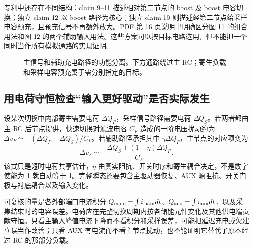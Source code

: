 专利中还存在不同结构：claim 9--11 描述相对第二节点的 boost 及 boost 电容切换；独立 claim 12 以 boost 路径为核心；独立 claim 19 则描述经第二节点给采样电容预充，且预充信号不再额外放大。PDF 第 16 页说明书明确区分图 11 的组合用法和图 12 的两个辅助输入用法。这些方案可以按目标电路选用，但不能把一个  同时当作所有模拟通路的实现证明。

\begin{figure}[htbp]\centering
{}
\caption{主信号和辅助充电路径的功能分离。下方通路绕过主 RC；寄生负载和采样电容预充属于需分别指定的目标。}
\end{figure}

\subsection{用电荷守恒检查“输入更好驱动”是否实际发生}
设某次切换中内部寄生需要电荷 \(\Delta Q_P\)，采样信号路径需要电荷 \(\Delta Q_S\)。若两者都由主 RC 后节点提供，快速切换对滤波电容 \(C_F\) 造成的一阶电压扰动约为 \(\Delta v_F\simeq-(\Delta Q_P+\Delta Q_S)/C_F\)。若辅助路径承担其中 \(\eta\Delta Q_P\)，主节点的对应项变为
\begin{equation}
\Delta v_F\simeq-\frac{\Delta Q_S+(1-\eta)\Delta Q_P}{C_F}.
\end{equation}
该式只是短时电荷共享估计，\(\eta\) 由真实阻抗、开关时序和寄生耦合决定，不是数字使能为 1 就自动等于 1。完整瞬态还要包含主驱动器恢复、AUX 源阻抗、开关门极与衬底耦合以及输入变化。

可复核的量是各外部端口电流积分 \(Q_{\rm main}=\int i_{\rm main}dt\)、\(Q_{\rm aux}=\int i_{\rm aux}dt\)，以及采集结束时的电容误差。电荷应在完整切换周期内按各储能元件变化及其他供电端贡献守恒。只看主输入峰值电流下降而不看积分和采样误差，可能把延迟充电或欠建立误当作改善；只看 AUX 有电流而不看主节点扰动，也不能证明它替代了原本经过 RC 的那部分负载。

